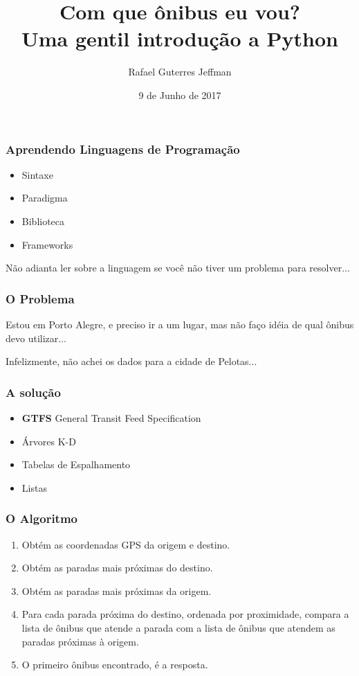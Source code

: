 \documentclass[aspectratio=169,14pt]{beamer}
\title{Com que ônibus eu vou? \\ \large{Uma gentil introdução a Python}}
\author{Rafael Guterres Jeffman}
\institute{Faculdade Senac Porto Alegre \\ Tchelinux}
\date{9 de Junho de 2017}
\begin{document}
\begin{frame}
    \titlepage
\end{frame}

\begin{frame}
    \frametitle{Aprendendo Linguagens de Programação}
    \begin{itemize}
        \item Sintaxe
        \item Paradigma
        \item Biblioteca
        \item Frameworks
    \end{itemize}
\end{frame}

\begin{frame}
    \begin{center}
    Não adianta ler sobre a linguagem  se você não tiver um problema
    para resolver...
    \end{center}
\end{frame}

\begin{frame}
    \frametitle{O Problema}
    
    \vfill
    \begin{center}
        Estou em Porto Alegre, e preciso ir a um lugar, mas não faço
        idéia de qual ônibus devo utilizar...
    \end{center}
    \vfill
    \vfill
    \hfill
    \tiny{Infelizmente, não achei os dados para a cidade de Pelotas...}
\end{frame}

\begin{frame}
    \frametitle{A solução}
    \begin{itemize}
        \setlength\itemsep{1em}
        \item \textbf{GTFS} General Transit Feed Specification
        \item Árvores K-D
        \item Tabelas de Espalhamento
        \item Listas
    \end{itemize}
\end{frame}

\begin{frame}
    \frametitle{O Algoritmo}
    \vfill
    \small \begin{enumerate}
        \item Obtém as coordenadas GPS da origem e destino.
        \item Obtém as paradas mais próximas do destino.
        \item Obtém as paradas mais próximas da origem.
        \item Para cada parada próxima do destino, ordenada por
        proximidade, compara a lista de ônibus que atende a parada com
        a lista de ônibus que atendem as paradas próximas à origem.
        \item O primeiro ônibus encontrado, é a resposta.
    \end{enumerate}
\end{frame}
\end{document}

